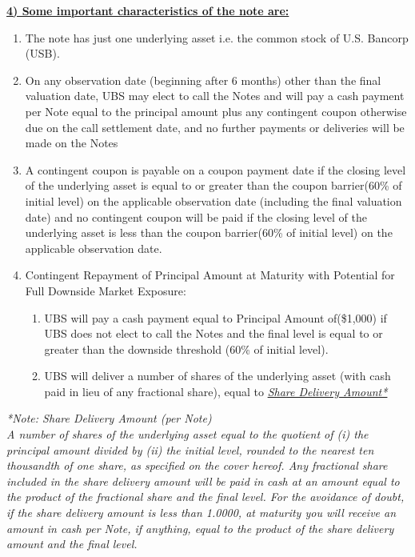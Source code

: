\documentclass[12pt,a4paper]{article}
\begin{document}
\underline{\textbf{4) Some important characteristics of the note are:}}
\begin{enumerate}
\item The note has just one underlying asset i.e. the common stock of U.S. Bancorp (USB). 
\item On any observation date (beginning after 6 months) other than the final valuation date, UBS may elect to call the Notes and will pay a cash payment per Note equal to the principal amount plus any contingent coupon otherwise due on the call settlement date, and no further payments or deliveries will be made on the Notes
\item A contingent coupon is payable on a coupon payment date if the closing level of the underlying asset is equal to or greater than the coupon barrier(60\% of initial level) on the applicable observation date (including the final valuation date) and no contingent coupon will be paid if the closing level of the underlying asset is less than the coupon barrier(60\% of initial level) on the applicable observation date.
\item Contingent Repayment of Principal Amount at Maturity with Potential for Full Downside Market Exposure:
	\begin{enumerate}
	\item UBS will pay a cash payment equal to Principal Amount of(\$1,000) if UBS does not elect to call the Notes and the final level is equal to or greater than the downside 			threshold (60\% of initial level).
	\item UBS will deliver a number of shares of the underlying asset (with cash paid in lieu of any fractional share), equal to \underline{\textit{Share Delivery Amount*}}
	\end{enumerate}
\end{enumerate}
{\small \textit{*Note: Share Delivery Amount (per Note)\\
A number of shares of the underlying asset equal to the quotient of (i) the principal amount divided by (ii) the initial level, rounded to the nearest ten thousandth of one share, as specified on the cover hereof. Any fractional share included in the share delivery amount will be paid in cash at an amount equal to the product of the fractional share and the final level. For the avoidance of doubt, if the share delivery amount is less than 1.0000, at maturity you will receive an amount in cash per Note, if anything, equal to the product of the share delivery amount and the final level.}}
\end{document}
